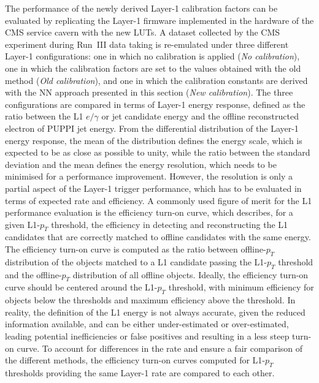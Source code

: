 The performance of the newly derived Layer-1 calibration factors can be evaluated by replicating the Layer-1 firmware implemented in the hardware of the CMS service cavern with the new LUTs. A dataset collected by the CMS experiment during Run~III data taking is re-emulated under three different Layer-1 configurations: one in which no calibration is applied (\textit{No calibration}), one in which the calibration factors are set to the values obtained with the old method (\textit{Old calibration}), and one in which the calibration constants are derived with the NN approach presented in this section (\textit{New calibration}).
The three configurations are compared in terms of Layer-1 energy response, defined as the ratio between the L1 $e/\gamma$ or jet candidate energy and the offline reconstructed electron of PUPPI jet energy. From the differential distribution of the Layer-1 energy response, the mean of the distribution defines the energy scale, which is expected to be as close as possible to unity, while the ratio between the standard deviation and the mean defines the energy resolution, which needs to be minimised for a performance improvement.
However, the resolution is only a partial aspect of the Layer-1 trigger performance, which has to be evaluated in terms of expected rate and efficiency. A commonly used figure of merit for the L1 performance evaluation is the efficiency turn-on curve, which describes, for a given L1-$p_T$ threshold, the efficiency in detecting and reconstructing the L1 candidates that are correctly matched to offline candidates with the same energy. The efficiency turn-on curve is computed as the ratio between offline-$p_T$ distribution of the objects matched to a L1 candidate passing the L1-$p_T$ threshold and the offline-$p_T$ distribution of all offline objects. 
Ideally, the efficiency turn-on curve should be centered around the L1-$p_T$ threshold, with minimum efficiency for objects below the thresholds and maximum efficiency above the threshold. 
In reality, the definition of the L1 energy is not always accurate, given the reduced information available, and can be either under-estimated or over-estimated, leading potential inefficiencies or false positives and resulting in a less steep turn-on curve.
To account for differences in the rate and ensure a fair comparison of the different methods, the efficiency turn-on curves computed for L1-$p_T$ thresholds providing the same Layer-1 rate are compared to each other.

\bigbreak

